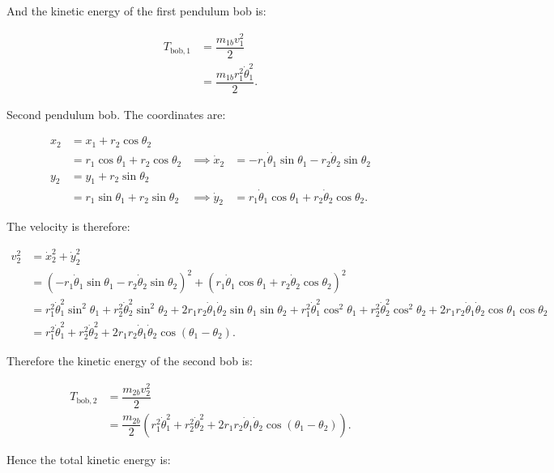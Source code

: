 \documentclass[12pt,a4paper,portrait]{article}
\begin{document}
	And the kinetic energy of the first pendulum bob is:
	
	\begin{align*}
		T_{\mathrm{bob}, 1} &= \dfrac{m_{1b} v_1^2}{2} \\
		&= \dfrac{m_{1b} r_1^2 \dot{\theta}_1^2}{2}.
	\end{align*}
	
	Second pendulum bob. The coordinates are:
	
	\begin{align*}
		x_2 &= x_1 + r_2 \cos{\theta_2} \\
		&= r_1 \cos{\theta_1} + r_2 \cos{\theta_2} &\implies \dot{x}_2 &= -r_1\dot{\theta}_1 \sin{\theta_1}-r_2\dot{\theta}_2 \sin{\theta_2}\\
		y_2 &= y_1 + r_2 \sin{\theta_2} \\
		&= r_1 \sin{\theta_1} + r_2 \sin{\theta_2} &\implies \dot{y}_2 &= r_1\dot{\theta}_1 \cos{\theta_1}+r_2\dot{\theta}_2 \cos{\theta_2}.
	\end{align*}
	
	The velocity is therefore:
	
	\begin{align*}
		v_2^2 &= \dot{x}_2^2 + \dot{y}_2^2 \\
		&= \left(-r_1\dot{\theta}_1 \sin{\theta_1}-r_2\dot{\theta}_2 \sin{\theta_2}\right)^2 + \left(r_1\dot{\theta}_1 \cos{\theta_1}+r_2\dot{\theta}_2 \cos{\theta_2}\right)^2 \\
		&= r_1^2 \dot{\theta}_1^2 \sin^2{\theta_1} + r_2^2 \dot{\theta}_2^2 \sin^2{\theta_2} + 2r_1 r_2 \dot{\theta}_1\dot{\theta}_2 \sin{\theta_1}\sin{\theta_2} + r_1^2 \dot{\theta}_1^2 \cos^2{\theta_1} + r_2^2 \dot{\theta}_2^2 \cos^2{\theta_2} + 2r_1 r_2 \dot{\theta}_1 \dot{\theta}_2 \cos{\theta_1}\cos{\theta_2} \\
		&= r_1^2 \dot{\theta}_1^2 + r_2^2 \dot{\theta}_2^2 + 2r_1 r_2 \dot{\theta}_1 \dot{\theta}_2 \cos{\left(\theta_1-\theta_2\right)}.
	\end{align*}
	
	Therefore the kinetic energy of the second bob is:
	
	\begin{align*}
		T_{\mathrm{bob}, 2} &= \dfrac{m_{2b} v_2^2}{2} \\
		&= \dfrac{m_{2b}}{2} \left(r_1^2 \dot{\theta}_1^2 + r_2^2 \dot{\theta}_2^2 + 2r_1 r_2 \dot{\theta}_1 \dot{\theta}_2 \cos{\left(\theta_1-\theta_2\right)}\right).
	\end{align*}
	
	Hence the total kinetic energy is:
	
\end{document}
